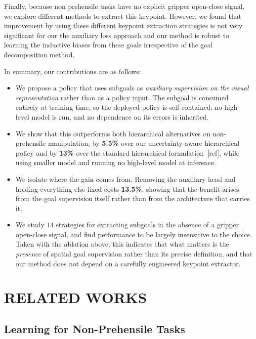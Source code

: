\documentclass[letterpaper, 10 pt, conference]{ieeeconf}  %
\begin{document}
Finally, because non prehensile tasks have no explicit gripper open-close signal, we explore different methods to extract this keypoint. However, we found that improvement by using these different keypoint extraction strategies is not very significant for our the auxiliary loss approach and our method is robust to learning the inductive biases from these goals irrespective of the goal decomposition method. 

In summary, our contributions are as follows:
\begin{itemize}
    \item We propose a policy that uses subgoals as \emph{auxiliary supervision on the visual representation} rather than as a policy input. The subgoal is consumed entirely at training time, so the deployed policy is self-contained: no high-level model is run, and no dependence on its errors is inherited.

    \item We show that this outperforms both hierarchical alternatives on non-prehensile manipulation, by \textbf{5.5\%} over our uncertainty-aware hierarchical policy and by \textbf{13\%} over the standard hierarchical formulation~[ref], while using smaller model and running no high-level model at inference.

    \item We isolate where the gain comes from. Removing the auxiliary head and holding everything else fixed costs \textbf{13.5\%}, showing that the benefit arises from the goal supervision itself rather than from the architecture that carries it.

    \item We study $14$ strategies for extracting subgoals in the absence of a gripper open-close signal, and find performance to be largely insensitive to the choice. Taken with the ablation above, this indicates that what matters is the \emph{presence} of spatial goal supervision rather than its precise definition, and that our method does not depend on a carefully engineered keypoint extractor.
\end{itemize}

\section{RELATED WORKS}

\subsection{Learning for Non-Prehensile Tasks}
\end{document}
